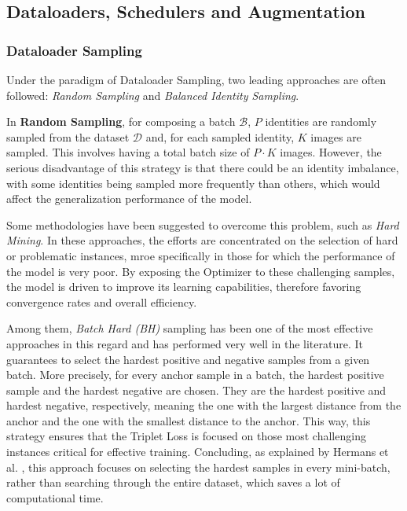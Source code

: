 \subsection{Dataloaders, Schedulers and Augmentation}
\subsubsection{Dataloader Sampling}
\label{subsubsec:DataloaderSampling}
Under the paradigm of Dataloader Sampling, two leading approaches are often followed: \textit{Random Sampling} \cite{TripletLossV2, EfficientBaseline} and \textit{Balanced Identity Sampling}.

In \textbf{Random Sampling}, for composing a batch $\mathcal{B}$, $P$ identities are randomly sampled from the dataset $\mathcal{D}$ and, for each sampled identity, $K$ images are sampled. This involves having a total batch size of $P \cdot K$ images. However, the serious disadvantage of this strategy is that there could be an identity imbalance, with some identities being sampled more frequently than others, which would affect the generalization performance of the model.

Some methodologies have been suggested to overcome this problem, such as \textit{Hard Mining}. In these approaches, the efforts are concentrated on the selection of hard or problematic instances, mroe specifically in those for which the performance of the model is very poor. By exposing the Optimizer to these challenging samples, the model is driven to improve its learning capabilities, therefore favoring convergence rates and overall efficiency.

Among them, \textit{Batch Hard (BH)} sampling has been one of the most effective approaches in this regard and has performed very well in the literature. It guarantees to select the hardest positive and negative samples from a given batch. More precisely, for every anchor sample in a batch, the hardest positive sample and the hardest negative are chosen. They are the hardest positive and hardest negative, respectively, meaning the one with the largest distance from the anchor and the one with the smallest distance to the anchor. This way, this strategy ensures that the Triplet Loss is focused on those most challenging instances critical for effective training. Concluding, as explained by Hermans et al. \cite{TripletLossV2}, this approach focuses on selecting the hardest samples in every mini-batch, rather than searching through the entire dataset, which saves a lot of computational time.

